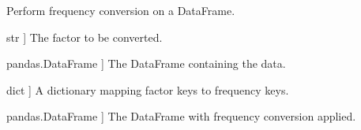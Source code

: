 \documentclass[letterpaper,10pt,english]{sphinxmanual}
\begin{document}
\begin{fulllineitems}
\label{\detokenize{utils:utils.frequency_conversion}}
\pysigstartsignatures
{}
\pysigstopsignatures
\sphinxAtStartPar
Perform frequency conversion on a DataFrame.
\begin{description}
\begin{description}
\sphinxlineitem{FACTOR}{[}str {]}
\sphinxAtStartPar
The factor to be converted.

\sphinxlineitem{df}{[}pandas.DataFrame {]}
\sphinxAtStartPar
The DataFrame containing the data.

\sphinxlineitem{freq\_dictionary}{[}dict {]}
\sphinxAtStartPar
A dictionary mapping factor keys to frequency keys.

\end{description}

\begin{description}
\sphinxlineitem{df}{[}pandas.DataFrame {]}
\sphinxAtStartPar
The DataFrame with frequency conversion applied.

\end{description}

\end{description}

\end{fulllineitems}

\end{document}

